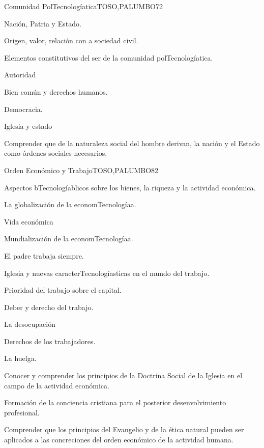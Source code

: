 \begin{syllabus}
\begin{unit}{Comunidad PolTecnologíatica}{TOSO,PALUMBO}{7}{2}
\begin{topics}
	\item Nación, Patria y Estado.
	\item Origen, valor, relación con a sociedad civil.
	\item Elementos constitutivos del ser de la comunidad polTecnologíatica.
	\item Autoridad
	\item Bien común y derechos humanos.
	\item Democracia.
	\item Iglesia y estado
\end{topics}
\begin{learningoutcomes}
	\item Comprender que de la naturaleza social del hombre derivan, la nación y el Estado como órdenes sociales necesarios.
\end{learningoutcomes}
\end{unit}

\begin{unit}{Orden Económico y Trabajo}{TOSO,PALUMBO}{8}{2}
\begin{topics}
	\item Aspectos bTecnologíablicos sobre los bienes, la riqueza y la actividad económica.
	\item La globalización de la economTecnologíaa.
	\item Vida económica
	\item Mundialización de la economTecnologíaa.
	\item El padre trabaja siempre.
	\item Iglesia y nuevas caracterTecnologíasticas en el mundo del trabajo.
	\item Prioridad del trabajo sobre el capital.
	\item Deber y derecho del trabajo.
	\item La desocupación
	\item Derechos de los trabajadores.
	\item La huelga.
\end{topics}
\begin{learningoutcomes}
	\item Conocer y comprender los principios de la Doctrina Social de la Iglesia en el campo de la actividad económica.
	\item Formación de la conciencia cristiana para el posterior desenvolvimiento profesional.
	\item Comprender que los principios del Evangelio y de la ética natural pueden ser aplicados a las concreciones del orden económico de la actividad humana.
\end{learningoutcomes}
\end{unit}



\begin{coursebibliography}
\end{coursebibliography}

\end{syllabus}
